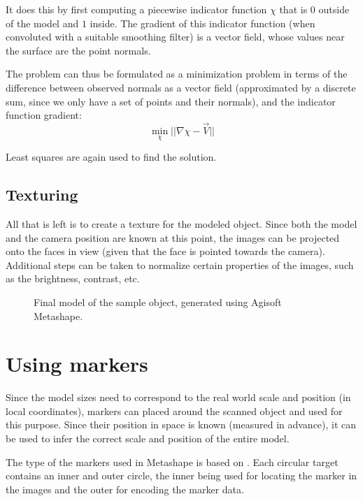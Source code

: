 It does this by first computing a piecewise indicator function $\chi$ that is $0$ outside of the model and $1$ inside. The gradient of this indicator function (when convoluted with a suitable smoothing filter) is a vector field, whose values near the surface are the point normals.

The problem can thus be formulated as a minimization problem in terms of the difference between observed normals as a vector field (approximated by a discrete sum, since we only have a set of points and their normals), and the indicator function gradient:
\begin{equation} \min_\chi || \nabla \chi - \vec{V}|| \end{equation}

Least squares are again used to find the solution.

\subsection{Texturing}
All that is left is to create a texture for the modeled object.
Since both the model and the camera position are known at this point, the images can be projected onto the faces in view (given that the face is pointed towards the camera).
Additional steps can be taken to normalize certain properties of the images, such as the brightness, contrast, etc.

\begin{figure}
	\centering
	\hfill
	\caption{Final model of the sample object, generated using Agisoft Metashape.}%
\end{figure}

\section{Using markers}
Since the model sizes need to correspond to the real world scale and position (in local coordinates), markers can placed around the scanned object and used for this purpose.
Since their position in space is known (measured in advance), it can be used to infer the correct scale and position of the entire model.

The type of the markers used in Metashape is based on \citet{schneider19913,borisPatent}.
Each circular target contains an inner and outer circle, the inner being used for locating the marker in the images and the outer for encoding the marker data.

